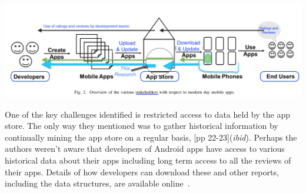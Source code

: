     {\centering
    \includegraphics[width=\linewidth]{images/related-work/future-trends-in-sweng-for-mobile-apps-fig-2-annotated-with-highlights.png}
    \label{fig:nagappan2016_future_trends_in_sw_eng_for_mobile_apps_figure_2_annotated}
    }
  

One of the key challenges identified is restricted access to data held by the app store. The only way they mentioned was to gather historical information by continually mining the app store on a regular basis, [pp 22-23](\textit{ibid}). Perhaps the authors weren't aware that developers of Android apps have access to various historical data about their apps including long term access to all the reviews of their apps. Details of how developers can download these and other reports, including the data structures, are available online~.

